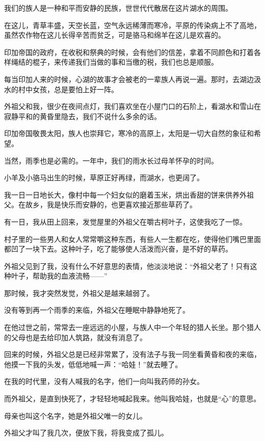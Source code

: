 \par 我们的族人是一种和平而安静的民族，世世代代散居在这片湖水的周围。
\par 在这儿，青草丰盛，天空长蓝，空气永远稀薄而寒冷，平原的传染病上不了高地，虽然农作物在这儿长得辛苦而贫乏，可是骆马和绵羊在这儿是欢喜的。
\par 印加帝国的政府，在收税和祭典的时候，会有他们的信差，拿着不同颜色和打着各样绳结的棍子，来传递我们当做的事和当缴的税，我们也总是顺服。
\par 每当印加人来的时候，心湖的故事才会被老的一辈族人再说一遍。那时，去湖边汲水的村中女孩，总是要怕上好一阵。
\par 外祖父和我，很少在夜间点灯，我们喜欢坐在小屋门口的石阶上，看湖水和雪山在寂静平和的黄昏里隐去，我们不说什么多余的话。
\par 印加帝国敬畏太阳，族人也崇拜它，寒冷的高原上，太阳是一切大自然的象征和希望。
\par 当然，雨季也是必需的。一年中，我们的雨水长过母羊怀孕的时间。
\par 小羊及小骆马出生的时候，草原正好再绿，而湖水，也更阔了。
\par 我一日一日地长大，像村中每一个妇女似的磨着玉米，烘出香甜的饼来供养外祖父。在故乡，我是快乐而安静的，也更喜欢接近那些草药了。
\par 有一日，我从田上回来，发觉屋里的外祖父在嚼古柯叶子，这使我吃了一惊。
\par 村子里的一些男人和女人常常嚼这种东西，有些人一生都在吃，使得他们嘴巴里面都凹了一块下去。这种叶子，吃了能够使人活泼而兴奋，是不好的草药。
\par 外祖父见到了我，没有什么不好意思的表情，他淡淡地说：“外祖父老了！只有这种叶子，帮助我的血液流畅——”
\par 那时候，我才突然发觉，外祖父是越来越弱了。
\par 没有等到再一个雨季的来临，外祖父在睡眠中静静地死了。
\par 在他过世之前，常常去一座远远的小屋，与族人中一个年轻的猎人长坐。那个猎人的父母也是去给印加人筑路，就没有消息了。
\par 回来的时候，外祖父总是已经非常累了，没有法子与我一同坐看黄昏和夜的来临，他摸一下我的头发，低低地喊一声：“哈娃！”就去睡了。
\par 在我的时代里，没有人喊我的名字，他们一向叫我药师的孙女。
\par 而外祖父，是直到快死了，才轻轻地喊起我来。他叫我哈娃，也就是“心”的意思。
\par 母亲也叫这个名字，她是外祖父唯一的女儿。
\par 外祖父才叫了我几次，便放下我，将我变成了孤儿。
